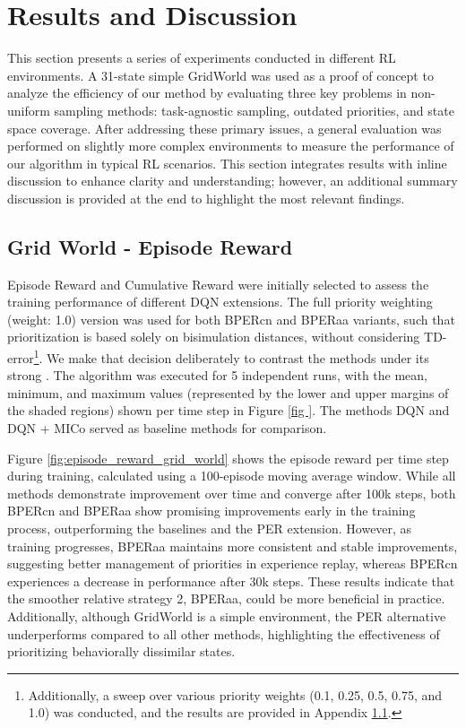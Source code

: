 
\chapter{Results and Discussion}

This section presents a series of experiments conducted in different RL environments. A 31-state simple GridWorld was used as a proof of concept to analyze the efficiency of our method by evaluating three key problems in non-uniform sampling methods: task-agnostic sampling, outdated priorities, and state space coverage. After addressing these primary issues, a general evaluation was performed on slightly more complex environments to measure the performance of our algorithm in typical RL scenarios. This section integrates results with inline discussion to enhance clarity and understanding; however, an additional summary discussion is provided at the end to highlight the most relevant findings.

\section{Grid World - Episode Reward}
Episode Reward and Cumulative Reward were initially selected to assess the training performance of different DQN extensions. The full priority weighting (weight: 1.0) version was used for both BPERcn and BPERaa variants, such that prioritization is based solely on bisimulation distances, without considering TD-error\footnote{Additionally, a sweep over various priority weights (0.1, 0.25, 0.5, 0.75, and 1.0) was conducted, and the results are provided in Appendix \ref{}.}. We make that decision deliberately to contrast the methods under its strong . The algorithm was executed for 5 independent runs, with the mean, minimum, and maximum values (represented by the lower and upper margins of the shaded regions) shown per time step in Figure \ref{fig
}. The methods DQN and DQN + MICo served as baseline methods for comparison.

Figure \ref{fig:episode_reward_grid_world} shows the episode reward per time step during training, calculated using a 100-episode moving average window. While all methods demonstrate improvement over time and converge after 100k steps, both BPERcn and BPERaa show promising improvements early in the training process, outperforming the baselines and the PER extension. However, as training progresses, BPERaa maintains more consistent and stable improvements, suggesting better management of priorities in experience replay, whereas BPERcn experiences a decrease in performance after 30k steps. These results indicate that the smoother relative strategy 2, BPERaa, could be more beneficial in practice. Additionally, although GridWorld is a simple environment, the PER alternative underperforms compared to all other methods, highlighting the effectiveness of prioritizing behaviorally dissimilar states.

